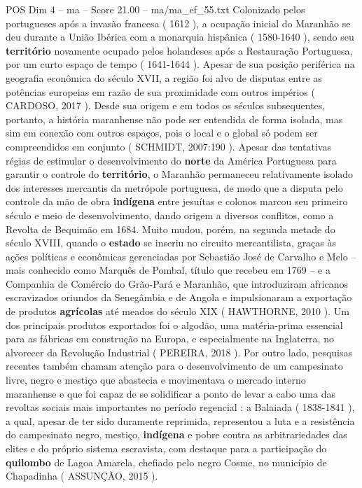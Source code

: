 \begin{textsample}{POS Dim 4 – ma – Score 21.00 – ma/ma\_ef\_55.txt}
Colonizado pelos portugueses após a invasão francesa ( 1612 ), a ocupação inicial do Maranhão se deu durante a União Ibérica com a monarquia hispânica ( 1580-1640 ), sendo seu \textbf{território} novamente ocupado pelos holandeses após a Restauração Portuguesa, por um curto espaço de tempo ( 1641-1644 ).
Apesar de sua posição periférica na geografia econômica do século XVII, a região foi alvo de disputas entre as potências europeias em razão de sua proximidade com outros impérios ( CARDOSO, 2017 ).
Desde sua origem e em todos os séculos subsequentes, portanto, a história maranhense não pode ser entendida de forma isolada, mas sim em conexão com outros espaços, pois o local e o global só podem ser compreendidos em conjunto ( SCHMIDT, 2007:190 ).
Apesar das tentativas régias de estimular o desenvolvimento do \textbf{norte} da América Portuguesa para garantir o controle do \textbf{território}, o Maranhão permaneceu relativamente isolado dos interesses mercantis da metrópole portuguesa, de modo que a disputa pelo controle da mão de obra \textbf{indígena} entre jesuítas e colonos marcou seu primeiro século e meio de desenvolvimento, dando origem a diversos conflitos, como a Revolta de Bequimão em 1684.
Muito mudou, porém, na segunda metade do século XVIII, quando o \textbf{estado} se inseriu no circuito mercantilista, graças às ações políticas e econômicas gerenciadas por Sebastião José de Carvalho e Melo – mais conhecido como Marquês de Pombal, título que recebeu em 1769 – e a Companhia de Comércio do Grão-Pará e Maranhão, que introduziram africanos escravizados oriundos da Senegâmbia e de Angola e impulsionaram a exportação de produtos \textbf{agrícolas} até meados do século XIX ( HAWTHORNE, 2010 ).
Um dos principais produtos exportados foi o algodão, uma matéria-prima essencial para as fábricas em construção na Europa, e especialmente na Inglaterra, no alvorecer da Revolução Industrial ( PEREIRA, 2018 ).
Por outro lado, pesquisas recentes também chamam atenção para o desenvolvimento de um campesinato livre, negro e mestiço que abastecia e movimentava o mercado interno maranhense e que foi capaz de se solidificar a ponto de levar a cabo uma das revoltas sociais mais importantes no período regencial : a Balaiada ( 1838-1841 ), a qual, apesar de ter sido duramente reprimida, representou a luta e a resistência do campesinato negro, mestiço, \textbf{indígena} e pobre contra as arbitrariedades das elites e do próprio sistema escravista, com destaque para a participação do \textbf{quilombo} de Lagoa Amarela, chefiado pelo negro Cosme, no município de Chapadinha ( ASSUNÇÃO, 2015 ).

\end{textsample}
